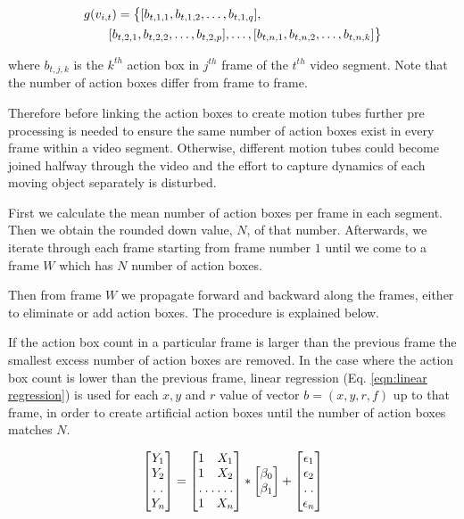 \begin{equation}
\label{eqn:action box}
\begin{split}
\MoveEqLeft
 g(v_{i,t}) = \big\{[b_{t,1,1},b_{t,1,2},\dots,b_{t,1,q}],\\
 & [b_{t,2,1},b_{t,2,2},\dots,b_{t,2,p}],\dots,[b_{t,n,1},b_{t,n,2},\dots,b_{t,n,k}]\big\}
\end{split}
\end{equation}

where $b_{t,j,k}$ is the $k^{th}$ action box in $j^{th}$ frame of the $t^{th}$ video segment. Note that the number of
action boxes differ from frame to frame.

Therefore before linking the action boxes to create motion tubes further pre processing is needed to ensure the same number of action
boxes exist in every frame within a video segment. Otherwise, different motion tubes could become joined halfway through the video and the
effort to capture dynamics of each moving object separately is disturbed.

First we calculate the mean number of action boxes per frame in each segment. Then we obtain the rounded down value, $N$, of that number.
Afterwards, we iterate through each frame starting from frame number $1$ until we come to a frame $W$ which has $N$ number of action boxes.

Then from frame $W$ we propagate forward and backward along the frames, either to eliminate or add action boxes. The procedure is explained below.

If the action box count in a particular frame is larger than the previous frame the smallest excess number of action boxes are removed.
In the case where the action box count is lower than the previous frame, linear regression (Eq. \ref{eqn:linear regression}) is used for each $x,y$ and $r$ value of vector $b = (x,y,r,f)$
up to that frame, in order to create artificial action boxes until the number of action boxes matches $N$.

\begin{equation}
\label{eqn:linear regression}
\begin{bmatrix}
    Y_{1}     \\
    Y_{2}     \\
    \hdotsfor{1} \\
    Y_{n}
\end{bmatrix}
=
\begin{bmatrix}
    1 & X_{1}     \\
    1 & X_{2}     \\
    \hdotsfor{2} \\
    1 & X_{n}
\end{bmatrix}
*
\begin{bmatrix}
    \beta_{0}     \\
    \beta_{1}
\end{bmatrix}
+
\begin{bmatrix}
    \epsilon_{1}     \\
    \epsilon_{2}    \\
    \hdotsfor{1} \\
    \epsilon_{n}
\end{bmatrix}
\end{equation}

